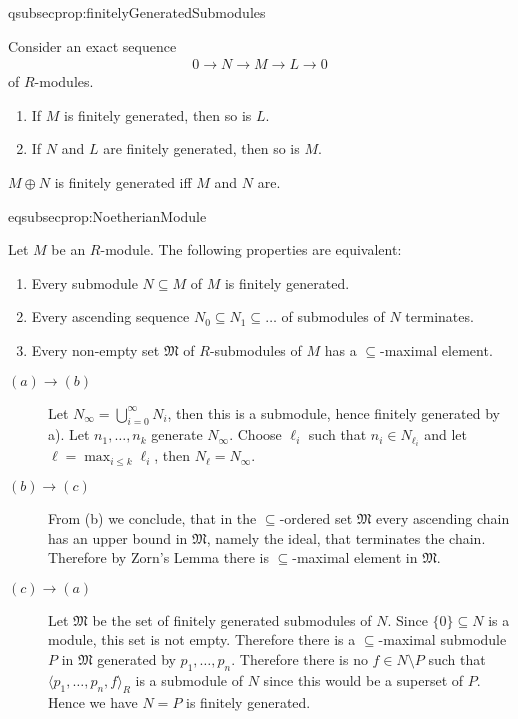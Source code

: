 \documentclass[DIV=14,parskip=full,pointednumbers]{scrartcl}
\newenvironment{alphanumerate}{\begin{enumerate}[label={$(\alph*)$},ref=\curthm]}{\end{enumerate}}
\theoremstyle{cthm}
\theoremstyle{cvarthm}
\renewenvironment{proof}[1][\proofname]
{\pushQED{\qed}\topsep0pt \partopsep0pt\trivlist\item[\hskip\labelsep\itshape #1.] }{\popQED\endtrivlist\addvspace{6pt plus 6pt}}
\theoremstyle{cdef}
\newcommand{\lbl}[1]{
	\label{#1}
	\ifmmode
	\expandafter\xdef\csname eqsubsec#1\endcsname{\thesubsection}
	\fi
}
\newcommand{\longto}{\longrightarrow}
\begin{document}
	\begin{prop} \lbl{prop:finitelyGeneratedSubmodules}
		Consider an exact sequence
		\begin{align*}
		0\longto N\longto M\longto L\longto 0
		\end{align*}
		of $R$-modules.
		\begin{alphanumerate}
			\item If $M$ is finitely generated, then so is $L$.
			\item If $N$ and $L$ are finitely generated, then so is $M$.
		\end{alphanumerate}
	\end{prop}
	
	\begin{cor}
		$M\oplus N$ is finitely generated iff $M$ and $N$ are. 
	\end{cor}
	\begin{prop}\lbl{prop:NoetherianModule}
		Let $M$ be an $R$-module. The following properties are equivalent:
		\begin{alphanumerate}
			\item Every submodule $N\subseteq M$ of $M$ is finitely generated.
			\item Every ascending sequence $N_0\subseteq N_1\subseteq \ldots$ of submodules of $N$ terminates.
			\item Every non-empty set $\mathfrak{M}$ of $R$-submodules of $M$ has a $\subseteq$-maximal element.
		\end{alphanumerate}
	\end{prop}
	\begin{proof}
		\begin{description}
			\item [$(a)\to(b)$] Let $N_\infty = \bigcup_{i=0}^\infty N_i$, then this is a submodule, hence finitely generated by a). Let $n_1,\ldots, n_k$ generate $N_\infty$. Choose $\ell_i$ such that $n_i\in N_{\ell_i}$ and let $\ell = \max_{i\leq k}\ell_i$, then $N_\ell = N_\infty$.
			\item [$(b)\to (c)$] From (b) we conclude, that in the $\subseteq$-ordered set $\mathfrak{M}$ every ascending chain has an upper bound in $\mathfrak{M}$, namely the ideal, that terminates the chain. Therefore by Zorn's Lemma there is $\subseteq$-maximal element in $\mathfrak{M}$.
			\item[$(c)\to (a)$] Let $\mathfrak{M}$ be the set of finitely generated submodules of $N$. Since $\{0\}\subseteq N$ is a module, this set is not empty. Therefore there is a $\subseteq$-maximal submodule $P$ in $\mathfrak{M}$ generated by $p_1,\ldots, p_n$. Therefore there is no $f\in N\setminus P$ such that $\langle p_1,\ldots, p_n, f\rangle_R$ is a submodule of $N$ since this would be a superset of $P$. Hence we have $N=P$ is finitely generated.
		\end{description}
	\end{proof}
	
\end{document}
